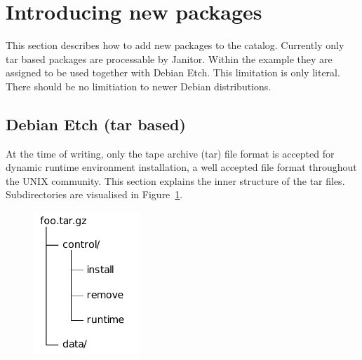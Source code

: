 \section{Introducing new packages}\label{sec:catalog}

This section describes how to add new packages to the catalog. Currently only tar based packages are processable by Janitor.
Within the example they are assigned to be used together with Debian Etch. This limitation is only literal. 
There should be no limitiation
to newer Debian distributions.

\subsection{Debian Etch (tar based)}

At the time of writing, only the tape archive (tar) file format is accepted for dynamic runtime environment installation, 
a well accepted file format throughout the UNIX community. This section explains the inner structure of the tar files. 
Subdirectories are visualised in Figure~\ref{fig:tar_folder}.

\begin{figure}
  \begin{center}
    \includegraphics[width=4cm]{images/tar_folder.pdf}
    \label{fig:tar_folder}
  \end{center}
\end{figure}

